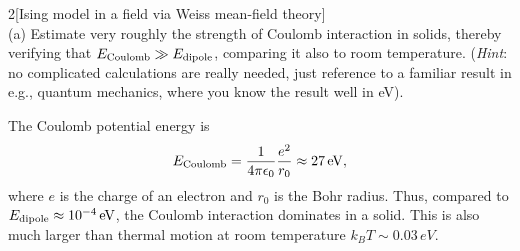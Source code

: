 \documentclass[12pt]{article}
\begin{document}
\begin{problem}{2}[Ising model in a field via Weiss mean-field theory]~\\

(a) Estimate very roughly the strength of Coulomb interaction in solids, thereby
verifying that $E_\t{Coulomb}\gg E_\t{dipole}$, comparing it also to room
temperature. (\textit{Hint}: no complicated calculations are really needed, just
reference to a familiar result in e.g., quantum mechanics, where you know the
result well in \si{eV}).
\begin{solution}
The Coulomb potential energy is
\begin{equation}
    E_\t{Coulomb}=\frac1{4\pi\epsilon_0}\frac{e^2}{r_0}\approx 27\,\si{eV},
\end{equation}
where $e$ is the charge of an electron and $r_0$ is the Bohr radius. Thus,
compared to $E_\t{dipole}\approx10^{-4}\,\si{eV}$, the Coulomb interaction
dominates in a solid. This is also much larger than thermal motion at room
temperature $k_BT\sim0.03\,\si{eV}$.
\end{solution}


\end{problem}
\end{document}

